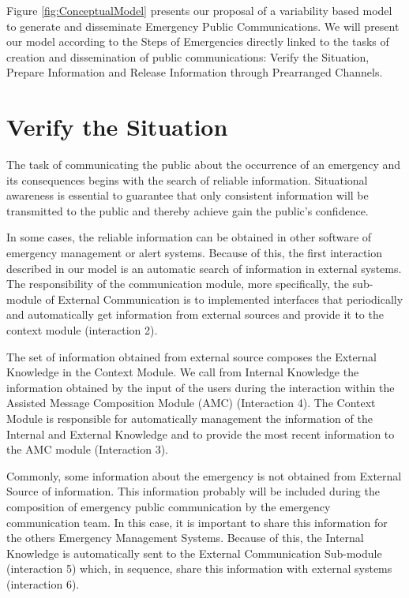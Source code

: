 Figure \ref{fig:ConceptualModel} presents our proposal of a variability based model to generate and disseminate Emergency Public Communications. We will present our model according to the Steps of Emergencies directly linked to the tasks of creation and dissemination of public communications: Verify the Situation, Prepare Information and Release Information through Prearranged Channels.

\section{Verify the Situation}

The task of communicating the public about the occurrence of an emergency and its consequences begins with the search of reliable information. Situational awareness is essential to guarantee that only consistent information will be transmitted to the public and thereby achieve gain the public's confidence. 

In some cases, the reliable information can be obtained in other software of emergency management or alert systems. Because of this, the first interaction described in our model is an automatic search of information in external systems. The responsibility of the communication module, more specifically, the sub-module of External Communication is to implemented interfaces that periodically and automatically get information from external sources and provide it to the context module (interaction 2). 

The set of information obtained from external source composes the External Knowledge in the Context Module. We call from Internal Knowledge the information obtained by the input of the users during the interaction within the Assisted Message Composition Module (AMC) (Interaction 4). The Context Module is responsible for automatically management the information of the Internal and External Knowledge and to provide the most recent information to the AMC module (Interaction 3).

Commonly, some information about the emergency is not obtained from External Source of information. This information probably will be included during the composition of emergency public communication by the emergency communication team. In this case, it is important to share this information for the others Emergency Management Systems. Because of this, the Internal Knowledge is automatically sent to the External Communication Sub-module (interaction 5) which, in sequence, share this information with external systems (interaction 6).


